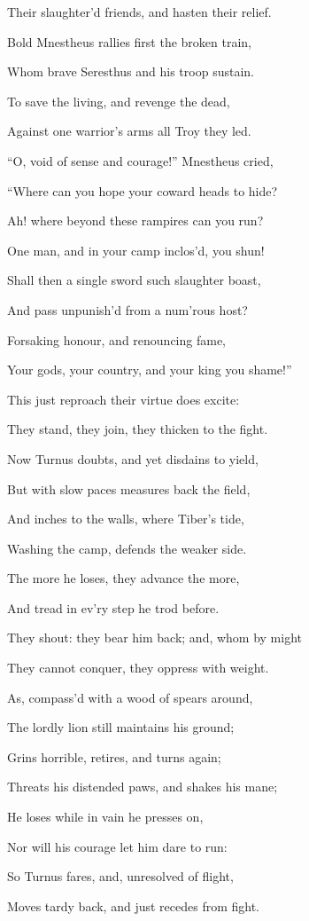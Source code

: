 Their slaughter’d friends, and hasten their relief.

Bold Mnestheus rallies first the broken train,

Whom brave Seresthus and his troop sustain.

To save the living, and revenge the dead,

Against one warrior’s arms all Troy they led.

“O, void of sense and courage!” Mnestheus cried,

“Where can you hope your coward heads to hide?

Ah! where beyond these rampires can you run?

One man, and in your camp inclos’d, you shun!

Shall then a single sword such slaughter boast,

And pass unpunish’d from a num’rous host?

Forsaking honour, and renouncing fame,

Your gods, your country, and your king you shame!”

This just reproach their virtue does excite:

They stand, they join, they thicken to the fight.

Now Turnus doubts, and yet disdains to yield,

But with slow paces measures back the field,

And inches to the walls, where Tiber’s tide,

Washing the camp, defends the weaker side.

The more he loses, they advance the more,

And tread in ev’ry step he trod before.

They shout: they bear him back; and, whom by might

They cannot conquer, they oppress with weight.

As, compass’d with a wood of spears around,

The lordly lion still maintains his ground;

Grins horrible, retires, and turns again;

Threats his distended paws, and shakes his mane;

He loses while in vain he presses on,

Nor will his courage let him dare to run:

So Turnus fares, and, unresolved of flight,

Moves tardy back, and just recedes from fight.

